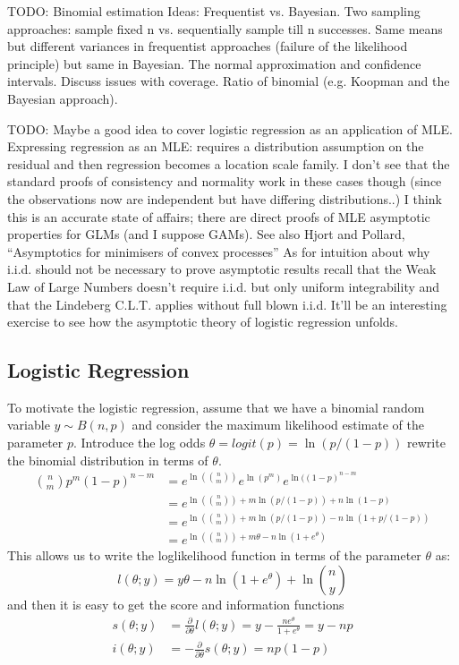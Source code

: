 TODO: Binomial estimation
Ideas:  Frequentist vs. Bayesian.  Two sampling approaches: sample
fixed n vs. sequentially sample till n successes.  Same means but
different variances in frequentist approaches (failure of the
likelihood principle) but same in Bayesian.
The normal approximation and confidence intervals.  Discuss issues
with coverage.  Ratio of binomial (e.g. Koopman and the Bayesian approach).

TODO: Maybe a good idea to cover logistic regression as an application
of MLE.  Expressing regression as an MLE: requires a distribution
assumption on the residual and then regression becomes a location
scale family.  I don't see that the standard proofs of consistency and
normality work in these cases though (since the observations now are
independent but have differing distributions..)  I think this is an
accurate state of affairs; there are direct proofs of MLE asymptotic
properties for GLMs (and I suppose GAMs).  See also Hjort and Pollard,
``Asymptotics for minimisers of convex processes''  As for intuition
about why i.i.d. should not be necessary to prove asymptotic results
recall that the Weak Law of Large Numbers doesn't require i.i.d. but
only uniform integrability and that the Lindeberg C.L.T. applies
without full blown i.i.d.  It'll be an interesting exercise to see how
the asymptotic theory of logistic regression unfolds.

\subsection{Logistic Regression}
To motivate the logistic regression, assume that we have a binomial
random variable $y \sim B(n,p)$ and consider the maximum likelihood
estimate of the parameter $p$.  Introduce the log odds $\theta =
logit(p) = \ln(p/(1-p))$ rewrite the binomial
distribution in terms of $\theta$.
\begin{align}
\binom{n}{m}p^m(1-p)^{n-m} & = e^{\ln(\binom{n}{m})}
e^{\ln(p^m)}e^{\ln((1-p)^{n-m}} \\
& = e^{\ln(\binom{n}{m}) + m \ln(p/(1-p)) +
  n \ln(1-p)} \\
& = e^{\ln(\binom{n}{m}) + m \ln(p/(1-p)) -  n \ln(1 + p/(1-p))} \\
& = e ^ {\ln(\binom{n}{m}) + m \theta - n \ln(1+e^\theta)}
\end{align}
This allows us to write the loglikelihood function in terms of the
parameter $\theta$ as:
$$
l(\theta; y) = y\theta - n\ln(1+e^\theta) + \ln\binom{n}{y}
$$
and then it is easy to get the score and information functions
\begin{align}
s(\theta; y) & = \frac{\partial}{\partial \theta} l(\theta;y) = y -
\frac{n e^\theta}{1+e^\theta}= y - np \\
i(\theta; y) & = -\frac{\partial}{\partial \theta} s(\theta;y) = np(1-p)
\end{align}
